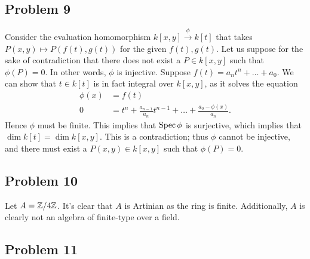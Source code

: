 \documentclass{../../mathnotes}
\begin{document}
\subsection*{Problem 9}

Consider the evaluation homomorphism $k[x,y]\overset{\phi}{\to} k[t]$ that takes $P(x,y)\mapsto P(f(t),g(t))$ for the given $f(t),g(t)$.
Let us suppose for the sake of contradiction that there does not exist a $P\in k[x,y]$ such that $\phi(P)=0$. In other words, $\phi$ is injective.
Suppose $f(t)=a_nt^n+\ldots+a_0$. We can show that $t\in k[t]$ is in fact integral over $k[x,y]$, as it solves the equation
\begin{align*}
    \phi(x)&=f(t)\\
    0&=t^n+\frac{a_{n-1}}{a_n}t^{n-1}+\ldots+\frac{a_0-\phi(x)}{a_n}.
\end{align*}
Hence $\phi$ must be finite. This implies that $\operatorname{Spec}\phi$ is surjective, which implies that $\dim k[t]=\dim k[x,y]$. This is a contradiction;
thus $\phi$ cannot be injective, and there must exist a $P(x,y)\in k[x,y]$ such that $\phi(P)=0$.


\subsection*{Problem 10}

Let $A=\mathbb{Z}/4\mathbb{Z}$. It's clear that $A$ is Artinian as the ring is finite. Additionally, $A$ is clearly not an
algebra of finite-type over a field.

\subsection*{Problem 11}
\end{document}
